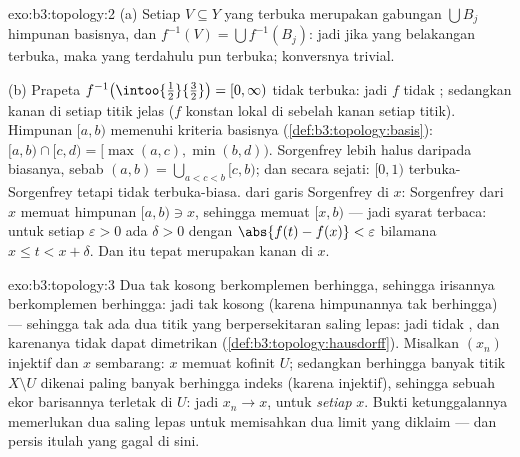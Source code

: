 \begin{solution}{exo:b3:topology:2}
(a) Setiap $V \subseteq Y$ yang terbuka merupakan gabungan $\bigcup B_j$ himpunan
basisnya, dan $f^{-1}(V) = \bigcup f^{-1}(B_j)$: jadi jika yang belakangan
terbuka, maka yang terdahulu pun terbuka; konversnya trivial.

(b) Prapeta $f^{-1}\bigl(\intoo{\frac12}{\frac32}\bigr) = [0, \infty)$
tidak terbuka: jadi $f$ tidak ; sedangkan  kanan di setiap
titik jelas ($f$ konstan lokal di sebelah kanan setiap
titik). Himpunan $[a, b)$ memenuhi kriteria basisnya
(\cref{def:b3:topology:basis}): $[a,b)\cap[c,d) = [\max(a,c),
\min(b,d))$.  Sorgenfrey lebih halus daripada 
biasanya, sebab $(a, b) = \bigcup_{a < c < b}[c, b)$; dan secara sejati:
$[0,1)$ terbuka-Sorgenfrey tetapi tidak terbuka-biasa.  dari
garis Sorgenfrey di $x$:  Sorgenfrey dari $x$
memuat himpunan  $[a, b) \ni x$, sehingga memuat $[x, b)$ ---
jadi syarat  terbaca: untuk setiap $\varepsilon > 0$
ada $\delta > 0$ dengan $\abs{f(t) - f(x)} < \varepsilon$
bilamana $x \leq t < x + \delta$. Dan itu tepat merupakan
 kanan di $x$.
\end{solution}

\begin{solution}{exo:b3:topology:3}
Dua  tak kosong berkomplemen berhingga, sehingga
irisannya berkomplemen berhingga: jadi tak kosong (karena himpunannya
tak berhingga) --- sehingga tak ada dua titik yang berpersekitaran saling lepas: jadi tidak
, dan karenanya tidak dapat dimetrikan
(\cref{def:b3:topology:hausdorff}). Misalkan $(x_n)$ injektif dan
$x$ sembarang:  $x$ memuat  kofinit
$U$; sedangkan berhingga banyak titik $X\setminus U$ dikenai paling
banyak berhingga indeks (karena injektif), sehingga sebuah ekor
barisannya terletak di $U$: jadi $x_n \to x$, untuk \emph{setiap} $x$. Bukti
ketunggalannya memerlukan dua  saling lepas untuk memisahkan
dua limit yang diklaim --- dan persis itulah yang gagal di sini.
\end{solution}

